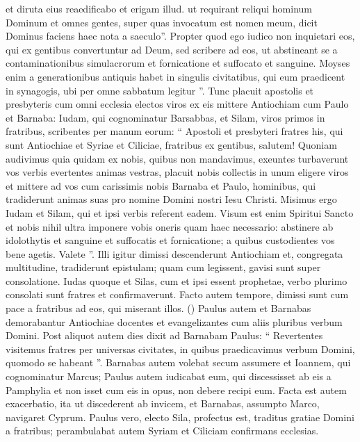 \begin{biblechapter}
\begin{biblechapter}
\begin{biblechapter}
\begin{biblechapter}
\begin{biblechapter}
\begin{biblechapter}
\begin{biblechapter}
\begin{biblechapter}
\begin{biblechapter}
\begin{biblechapter}
\begin{biblechapter}
\begin{biblechapter}
\begin{biblechapter}
\begin{biblechapter}
\begin{biblechapter}
 et diruta eius reaedificabo et erigam illud.
 \verse ut requirant reliqui hominum Dominum
 et omnes gentes, super quas invocatum est nomen meum,
 dicit Dominus faciens haec \verse nota a saeculo”.
 \verse Propter quod ego iudico non inquietari eos, qui ex gentibus convertuntur ad Deum, 
\verse sed scribere ad eos, ut abstineant se a contaminationibus simulacrorum et fornicatione et suffocato et sanguine. 
\verse Moyses enim a generationibus antiquis habet in singulis civitatibus, qui eum praedicent in synagogis, ubi per omne sabbatum legitur ”.
 \verse Tunc placuit apostolis et presbyteris cum omni ecclesia electos viros ex eis mittere Antiochiam cum Paulo et Barnaba: Iudam, qui cognominatur Barsabbas, et Silam, viros primos in fratribus, 
\verse scribentes per manum eorum: “ Apostoli et presbyteri fratres his, qui sunt Antiochiae et Syriae et Ciliciae, fratribus ex gentibus, salutem! 
\verse Quoniam audivimus quia quidam ex nobis, quibus non mandavimus, exeuntes turbaverunt vos verbis evertentes animas vestras, 
\verse placuit nobis collectis in unum eligere viros et mittere ad vos cum carissimis nobis Barnaba et Paulo, 
\verse hominibus, qui tradiderunt animas suas pro nomine Domini nostri Iesu Christi. 
\verse Misimus ergo Iudam et Silam, qui et ipsi verbis referent eadem. 
\verse Visum est enim Spiritui Sancto et nobis nihil ultra imponere vobis oneris quam haec necessario: 
\verse abstinere ab idolothytis et sanguine et suffocatis et fornicatione; a quibus custodientes vos bene agetis. Valete ”.
 \verse Illi igitur dimissi descenderunt Antiochiam et, congregata multitudine, tradiderunt epistulam; 
\verse quam cum legissent, gavisi sunt super consolatione. 
\verse Iudas quoque et Silas, cum et ipsi essent prophetae, verbo plurimo consolati sunt fratres et confirmaverunt. 
\verse Facto autem tempore, dimissi sunt cum pace a fratribus ad eos, qui miserant illos. 
(\verse) \verse Paulus autem et Barnabas demorabantur Antiochiae docentes et evangelizantes cum aliis pluribus verbum Domini.
 \verse Post aliquot autem dies dixit ad Barnabam Paulus: “ Revertentes visitemus fratres per universas civitates, in quibus praedicavimus verbum Domini, quomodo se habeant ”. 
\verse Barnabas autem volebat secum assumere et Ioannem, qui cognominatur Marcus; 
\verse Paulus autem iudicabat eum, qui discessisset ab eis a Pamphylia et non isset cum eis in opus, non debere recipi eum. 
\verse Facta est autem exacerbatio, ita ut discederent ab invicem, et Barnabas, assumpto Marco, navigaret Cyprum. 
\verse Paulus vero, electo Sila, profectus est, traditus gratiae Domini a fratribus; 
\verse perambulabat autem Syriam et Ciliciam confirmans ecclesias.
 

\end{biblechapter}
\end{biblechapter}
\end{biblechapter}
\end{biblechapter}
\end{biblechapter}
\end{biblechapter}
\end{biblechapter}
\end{biblechapter}
\end{biblechapter}
\end{biblechapter}
\end{biblechapter}
\end{biblechapter}
\end{biblechapter}
\end{biblechapter}
\end{biblechapter}

